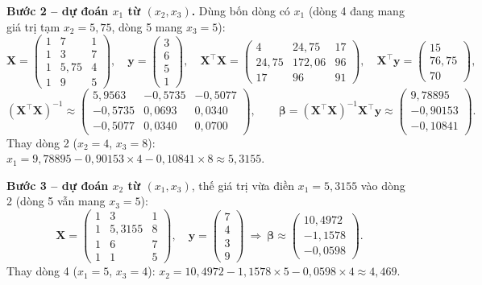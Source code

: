 \noindent\textbf{Bước 2 -- dự đoán $x_1$ từ $(x_2, x_3)$.} Dùng bốn dòng có $x_1$ (dòng 4 đang mang giá trị tạm $x_2 = 5{,}75$, dòng 5 mang $x_3 = 5$):
\[
    \mathbf{X} = \begin{pmatrix} 1 & 7 & 1 \\ 1 & 3 & 7 \\ 1 & 5{,}75 & 4 \\ 1 & 9 & 5 \end{pmatrix}, \quad
    \mathbf{y} = \begin{pmatrix} 3 \\ 6 \\ 5 \\ 1 \end{pmatrix}, \quad
    \mathbf{X}^\top\mathbf{X} = \begin{pmatrix} 4 & 24{,}75 & 17 \\ 24{,}75 & 172{,}06 & 96 \\ 17 & 96 & 91 \end{pmatrix}, \quad
    \mathbf{X}^\top\mathbf{y} = \begin{pmatrix} 15 \\ 76{,}75 \\ 70 \end{pmatrix},
\]
\[
    (\mathbf{X}^\top\mathbf{X})^{-1} \approx \begin{pmatrix} 5{,}9563 & -0{,}5735 & -0{,}5077 \\ -0{,}5735 & 0{,}0693 & 0{,}0340 \\ -0{,}5077 & 0{,}0340 & 0{,}0700 \end{pmatrix}, \qquad
    \boldsymbol{\beta} = (\mathbf{X}^\top\mathbf{X})^{-1}\mathbf{X}^\top\mathbf{y} \approx \begin{pmatrix} 9{,}78895 \\ -0{,}90153 \\ -0{,}10841 \end{pmatrix}.
\]
Thay dòng 2 ($x_2 = 4$, $x_3 = 8$): $x_1 = 9{,}78895 - 0{,}90153 \times 4 - 0{,}10841 \times 8 \approx 5{,}3155$.

\noindent\textbf{Bước 3 -- dự đoán $x_2$ từ $(x_1, x_3)$}, thế giá trị vừa điền $x_1 = 5{,}3155$ vào dòng 2 (dòng 5 vẫn mang $x_3 = 5$):
\[
    \mathbf{X} = \begin{pmatrix} 1 & 3 & 1 \\ 1 & 5{,}3155 & 8 \\ 1 & 6 & 7 \\ 1 & 1 & 5 \end{pmatrix}, \quad
    \mathbf{y} = \begin{pmatrix} 7 \\ 4 \\ 3 \\ 9 \end{pmatrix}
    \ \Rightarrow\
    \boldsymbol{\beta} \approx \begin{pmatrix} 10{,}4972 \\ -1{,}1578 \\ -0{,}0598 \end{pmatrix}.
\]
Thay dòng 4 ($x_1 = 5$, $x_3 = 4$): $x_2 = 10{,}4972 - 1{,}1578 \times 5 - 0{,}0598 \times 4 \approx 4{,}469$.

